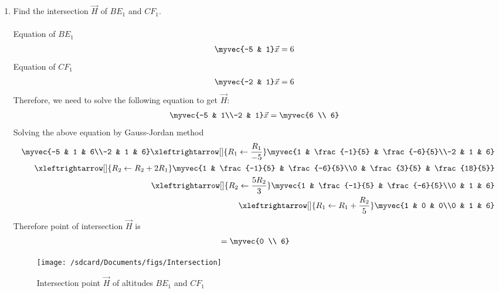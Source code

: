 \documentclass[11pt]{book}
\begin{document}
\begin{enumerate}[label=\thesection.\arabic*.,ref=\thesection.\theenumi]
	\item Find the intersection $\vec{H}$ of $BE_1$ and $CF_1$.\\
\solution\\
 Equation of $BE_1$
 \begin{align}
     \myvec{-5 & 1}\vec{x} &= 6
 \end{align}
  Equation of $CF_1$
 \begin{align}
    \myvec{-2 & 1}\vec{x} &= 6
 \end{align}
Therefore, we need to solve the following equation to get $\vec{H}$:
\begin{align}
        \myvec{-5 & 1\\-2 & 1} \vec{x} &= \myvec{6 \\ 6}
\end{align}
Solving the above equation by Gauss-Jordan method
\begin{align}
        \myvec{-5 & 1 & 6\\-2 & 1 & 6}
	 \xleftrightarrow[]{R_1 \leftarrow \frac{R_1}{-5}}
        \myvec{1 & \frac{-1}{5} & \frac{-6}{5}\\-2 & 1 & 6}\\
	 \xleftrightarrow[]{R_2 \leftarrow R_2 + 2R_1}
        \myvec{1 & \frac{-1}{5} & \frac{-6}{5}\\0 & \frac{3}{5} & \frac{18}{5}}\\
	 \xleftrightarrow[]{R_2 \leftarrow \frac{5R_2}{3}}
        \myvec{1 & \frac{-1}{5} & \frac{-6}{5}\\0 & 1 & 6}\\
        	 \xleftrightarrow[]{R_1 \leftarrow R_1 + \frac{R_2}{5}}
                  \myvec{1 & 0 & 0\\0 & 1 & 6}
\end{align}
Therefore point of intersection $\vec{H}$ is
\begin{align}
	&= \myvec{0 \\ 6}
\end{align}
\begin{figure}[H]
\texttt{[image: /sdcard/Documents/figs/Intersection]}
	\caption{Intersection point $\vec{H}$ of altitudes $BE_1$ and $CF_1$}
\label{fig:Interction point}
\end{figure}


\end{enumerate}
\end{document}
